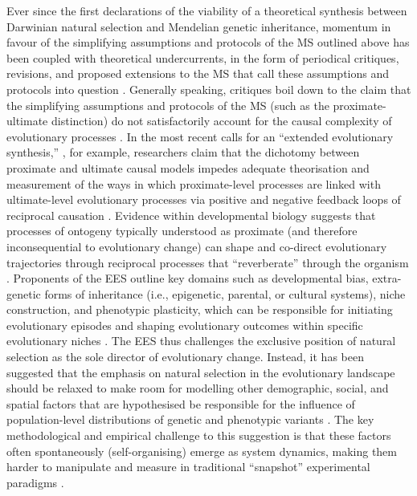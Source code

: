 Ever since the first declarations of the viability of a theoretical synthesis between Darwinian natural selection and Mendelian genetic inheritance, momentum in favour of the simplifying assumptions and protocols of the MS outlined above has been coupled with theoretical undercurrents, in the form of periodical critiques, revisions, and proposed extensions to the MS that call these assumptions and protocols into question \citep[see, for example][]{Waddington1950,Gould1980,Levins1985,Ingold1990,Ingold1995,Odling-Schmee2003,Piggliuci2007}. Generally speaking, critiques boil down to the claim that the simplifying assumptions and protocols of the MS (such as the proximate-ultimate distinction) do not satisfactorily account for the causal complexity of evolutionary processes \citep{Laland2011}. In the most recent calls for an ``extended evolutionary synthesis,'' \citep[EES, see][]{Pigliucci2007}, for example, researchers claim that the dichotomy between proximate and ultimate causal models impedes adequate theorisation and measurement of the ways in which proximate-level processes are linked with ultimate-level evolutionary processes via positive and negative feedback loops of reciprocal causation \citep{Pigliucci2007,Laland2011,Laland2013,Mesoudi2013,Laland2015}. Evidence within developmental biology suggests that processes of ontogeny typically understood as proximate (and therefore inconsequential to evolutionary change) can shape and co-direct evolutionary trajectories through reciprocal processes that ``reverberate'' through the organism \citep{Laland2013}. Proponents of the EES outline key domains such as developmental bias, extra-genetic forms of inheritance (i.e., epigenetic, parental, or cultural systems), niche construction, and phenotypic plasticity, which can be responsible for initiating evolutionary episodes and shaping evolutionary outcomes within specific evolutionary niches \citep{Laland2015}.  The EES thus challenges the exclusive position of natural selection as the sole director of evolutionary change.  Instead, it has been suggested that the emphasis on natural selection in the evolutionary landscape should be relaxed to make room for modelling other demographic, social, and spatial factors that are hypothesised be responsible for the influence of population-level distributions of genetic and phenotypic variants \citep{Mesoudi2013}.  The key methodological and empirical challenge to this suggestion is that these factors often spontaneously (self-organising) emerge as system dynamics, making them harder to manipulate and measure in traditional ``snapshot'' experimental paradigms \citep{Svensson2017}.

